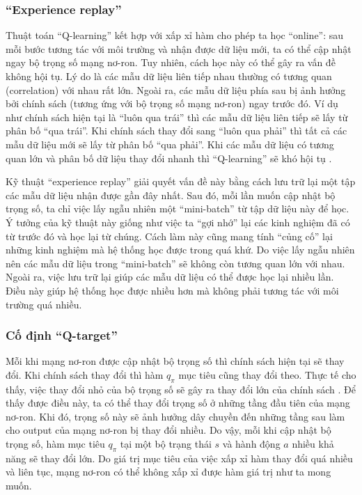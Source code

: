\subsubsection*{``Experience replay''}
	Thuật toán ``Q-learning'' kết hợp với xấp xỉ hàm cho phép ta học ``online'': sau mỗi bước tương tác với môi trường và nhận được dữ liệu mới, ta có thể cập nhật ngay bộ trọng số mạng nơ-ron.
	Tuy nhiên, cách học này có thể gây ra vấn đề không hội tụ.
	Lý do là các mẫu dữ liệu liên tiếp nhau thường có tương quan (correlation) với nhau rất lớn.
	Ngoài ra, các mẫu dữ liệu phía sau bị ảnh hưởng bởi chính sách (tương ứng với bộ trọng số mạng nơ-ron) ngay trước đó.
	Ví dụ như chính sách hiện tại là ``luôn qua trái'' thì các mẫu dữ liệu liên tiếp sẽ lấy từ phân bố ``qua trái''.
	Khi chính sách thay đổi sang ``luôn qua phải'' thì tất cả các mẫu dữ liệu mới sẽ lấy từ phân bố ``qua phải''.
	Khi các mẫu dữ liệu có tương quan lớn và phân bố dữ liệu thay đổi nhanh thì ``Q-learning'' sẽ khó hội tụ \cite{mnihdqn2015}.
	
	Kỹ thuật ``experience replay'' \cite{lin1993reinforcement} giải quyết vấn đề này bằng cách lưu trữ lại một tập các mẫu dữ liệu nhận được gần đây nhất.
	Sau đó, mỗi lần muốn cập nhật bộ trọng số, ta chỉ việc lấy ngẫu nhiên một ``mini-batch'' từ tập dữ liệu này để học.
	Ý tưởng của kỹ thuật này giống như việc ta ``gợi nhớ'' lại các kinh nghiệm đã có từ trước đó và học lại từ chúng.
	Cách làm này cũng mang tính ``củng cố'' lại những kinh nghiệm mà hệ thống học được trong quá khứ.
	Do việc lấy ngẫu nhiên nên các mẫu dữ liệu trong ``mini-batch'' sẽ không còn tương quan lớn với nhau.
	Ngoài ra, việc lưu trữ lại giúp các mẫu dữ liệu có thể được học lại nhiều lần.
	Điều này giúp hệ thống học được nhiều hơn mà không phải tương tác với môi trường quá nhiều.
	
\subsubsection*{Cố định ``Q-target''}
	Mỗi khi mạng nơ-ron được cập nhật bộ trọng số thì chính sách hiện tại sẽ thay đổi.
	Khi chính sách thay đổi thì hàm $q_{\pi}$ mục tiêu cũng thay đổi theo.
	Thực tế cho thấy, việc thay đổi nhỏ của bộ trọng số sẽ gây ra thay đổi lớn của chính sách \cite{mnih2013playing}.
	Để thấy được điều này, ta có thể thay đổi trọng số ở những tầng đầu tiên của mạng nơ-ron.
	Khi đó, trọng số này sẽ ảnh hưởng dây chuyền đến những tầng sau làm cho output của mạng nơ-ron bị thay đổi nhiều.
	Do vậy, mỗi khi cập nhật bộ trọng số, hàm mục tiêu $q_{\pi}$ tại một bộ trạng thái $s$ và hành động $a$ nhiều khả năng sẽ thay đổi lớn.
	Do giá trị mục tiêu của việc xấp xỉ hàm thay đổi quá nhiều và liên tục, mạng nơ-ron có thể không xấp xỉ được hàm giá trị như ta mong muốn.
	

